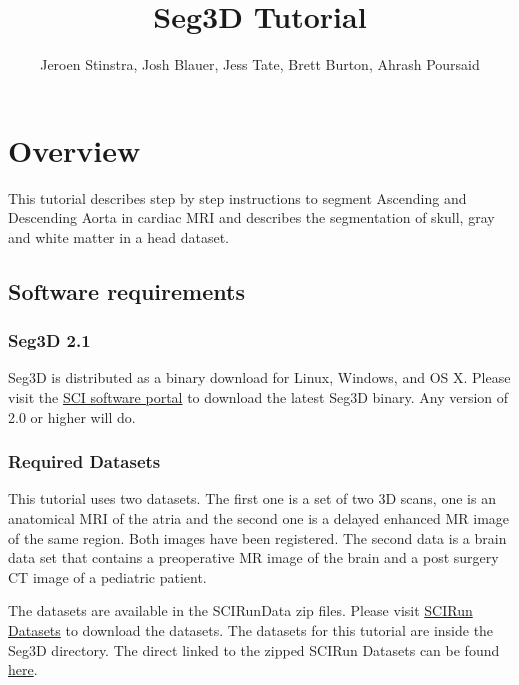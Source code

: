 \documentclass[fleqn,11pt,openany]{book}
\title{Seg3D Tutorial}
\author{Jeroen Stinstra, Josh Blauer, Jess Tate, Brett Burton, Ahrash Poursaid}
\begin{document}




\chapter{Overview}

\begin{introduction}

This tutorial describes step by step instructions to segment Ascending and Descending Aorta in cardiac MRI and describes the segmentation of skull, gray and white matter in a head dataset. 

\end{introduction}

\section{Software requirements}
\label{sec:softwarerequirements}
\subsection{Seg3D 2.1}

Seg3D is distributed as a binary download for Linux, Windows, and OS X. Please visit the \href{http://software.sci.utah.edu}{SCI software portal} to download the latest Seg3D binary. Any version of 2.0 or higher will do. 

\subsection{Required Datasets}

This tutorial uses two datasets. The first one is a set  of two 3D scans, one is an anatomical MRI of the atria and the second one is a delayed enhanced MR image of the same region. Both images have been registered. The second data is a brain data set that contains a preoperative MR image of the brain and a post surgery CT image of a pediatric patient.

The datasets are available in the SCIRunData zip files. Please visit \href{http://www.sci.utah.edu/cibc/software/106-scirun.html}{SCIRun Datasets} to download the datasets. The datasets for this tutorial are inside the Seg3D directory. The direct linked to the zipped SCIRun Datasets can be found \href{http://www.sci.utah.edu/download/scirun/4.4.html}{here}.
\end{document}
